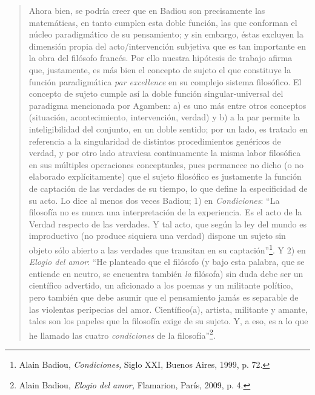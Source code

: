 \begin{quote}
Ahora bien, se podría creer que en Badiou son precisamente las matemáticas, en tanto cumplen esta doble función, las que conforman el núcleo paradigmático de su pensamiento; y sin embargo, éstas excluyen la dimensión propia del acto/intervención subjetiva que es tan importante en la obra del filósofo francés. Por ello nuestra hipótesis de trabajo afirma que, justamente, es más bien el concepto de sujeto el que constituye la función paradigmática \emph{par excellence} en su complejo sistema filosófico. El concepto de sujeto cumple así la doble función singular-universal del paradigma mencionada por Agamben: a) es uno más entre otros conceptos (situación, acontecimiento, intervención, verdad) y b) a la par permite la inteligibilidad del conjunto, en un doble sentido; por un lado, es tratado en referencia a la singularidad de distintos procedimientos genéricos de verdad, y por otro lado atraviesa continuamente la misma labor filosófica en sus múltiples operaciones conceptuales, pues permanece no dicho (o no elaborado explícitamente) que el sujeto filosófico es justamente la función de captación de las verdades de su tiempo, lo que define la especificidad de su acto. Lo dice  al menos dos veces Badiou; 1) en \emph{Condiciones}: \enquote{La filosofía no es nunca una interpretación de la experiencia. Es el acto de la Verdad respecto de las verdades. Y tal acto, que según la ley del mundo es improductivo (no produce siquiera una verdad) dispone un sujeto sin objeto sólo abierto a las verdades que transitan en su captación}\footnote{Alain Badiou, \emph{Condiciones,} Siglo XXI, Buenos Aires, 1999, p. 72.}. Y 2) en \emph{Elogio del amor}: \enquote{He planteado que el filósofo (y bajo esta palabra, que se entiende en neutro, se encuentra también \emph{la} filósofa) sin duda debe ser un científico advertido, un aficionado a los poemas y un militante político, pero también que debe asumir que el pensamiento jamás es separable de las violentas peripecias del amor. Científico(a), artista, militante y amante, tales son los papeles que la filosofía exige de su sujeto. Y, a eso, es a lo que he llamado las cuatro \emph{condiciones} de la filosofía}\footnote{Alain Badiou, \emph{Elogio del amor,} Flamarion, París, 2009, p. 4.}.


\end{quote}
